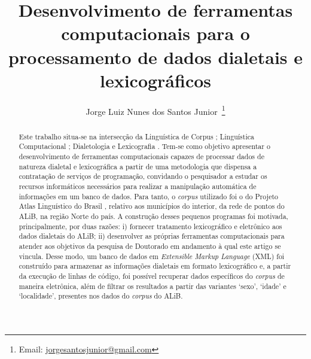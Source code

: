 \documentclass[portuguese]{textolivre}
\title{Desenvolvimento de ferramentas computacionais para o processamento de dados dialetais e lexicográficos}
\author[1]{Jorge Luiz Nunes dos Santos Junior~\orcid{0000-0002-1111-4148}\thanks{Email: \href{mailto:jorgesantosjunior@gmail.com}{jorgesantosjunior@gmail.com}}}
\affil[1]{Universidade Federal de Mato Grosso do Sul, Programa de Pós-Graduação em Letras, Três Lagoas, MS, Brasil.}
\begin{document}
\maketitle

\begin{polyabstract}
\begin{abstract}
Este trabalho situa-se na intersecção da Linguística de Corpus \cite{okeefe2010routledge}; Linguística Computacional \cite{kedia2020hands,srinivasa2018natural,manning2008introduction,manning1999foundations,chomsky1965}; Dialetologia \cite{cardoso2010,radtke1996,chambers1994} e Lexicografia \cite{tarp2008lexicography,tarp2011,tarp2015teoria,fuertes2015,leroyer2011}. Tem-se como objetivo apresentar o desenvolvimento de ferramentas computacionais capazes de processar dados de natureza dialetal e lexicográfica a partir de uma metodologia que dispensa a contratação de serviços de programação, convidando o pesquisador a estudar os recursos informáticos necessários para realizar a manipulação automática de informações em um banco de dados. Para tanto, o \textit{corpus} utilizado foi o do Projeto Atlas Linguístico do Brasil \cite{comite2001}, relativo aos municípios do interior, da rede de pontos do ALiB, na região Norte do país. A construção desses pequenos programas foi motivada, principalmente, por duas razões: i) fornecer tratamento lexicográfico e eletrônico aos dados dialetais do ALiB; ii) desenvolver as próprias ferramentas computacionais para atender aos objetivos da pesquisa de Doutorado em andamento à qual este artigo se vincula. Desse modo, um banco de dados em \textit{Extensible Markup Language} (XML) foi construído para armazenar as informações dialetais em formato lexicográfico e, a partir da execução de linhas de código, foi possível recuperar dados específicos do \textit{corpus} de maneira eletrônica, além de filtrar os resultados a partir das variantes ‘sexo’, ‘idade’ e ‘localidade’, presentes nos dados do \textit{corpus} do ALiB. 

\end{abstract}


\end{polyabstract}
\end{document}

